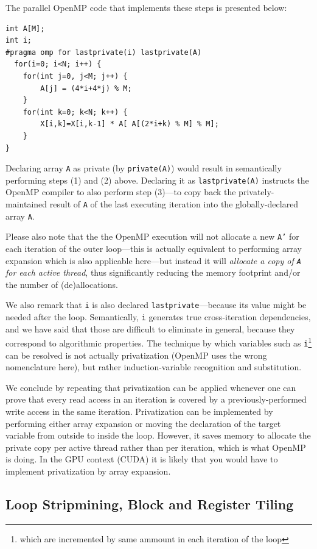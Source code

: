 \documentclass[acmsmall,review]{acmart}\settopmatter{printfolios=true,printccs=false,printacmref=false}
\begin{document}
The parallel OpenMP code that implements these steps is 
presented below:
\begin{lstlisting}[mathescape=true]
int A[M];
int i;
#pragma omp for lastprivate(i) lastprivate(A) 
  for(i=0; i<N; i++) {
    for(int j=0, j<M; j++) {
        A[j] = (4*i+4*j) % M;
    }
    for(int k=0; k<N; k++) {
        X[i,k]=X[i,k-1] * A[ A[(2*i+k) % M] % M];
    }
}
\end{lstlisting}\vspace{-2ex}
Declaring array {\tt A} as private (by {\tt private(A)}) would 
result in semantically performing steps (1) 
and (2) above. Declaring it as {\tt lastprivate(A)} instructs 
the OpenMP compiler to also perform step (3)---to copy back 
the privately-maintained result of {\tt A} of the last executing 
iteration into the globally-declared array {\tt A}.

Please also note that the the OpenMP execution will not allocate
a new {\tt A'} for each iteration of the outer loop---this is 
actually equivalent to performing array expansion which is also
applicable here---but instead it will {\em allocate a copy of 
{\tt A} for each active thread}, thus significantly reducing 
the memory footprint and/or the number of (de)allocations.
 
We also remark that {\tt i} is also declared
{\tt lastprivate}---because its value might be needed after
the loop. Semantically, {\tt i} generates true cross-iteration
dependencies, and we have said that those are difficult to eliminate
in general, because they correspond to algorithmic properties.
The technique by which variables such as {\tt i}\footnote{which are
incremented by same ammount in each iteration of the loop} can 
be resolved is not actually privatization (OpenMP uses the wrong 
nomenclature here), but rather induction-variable recognition and 
substitution.

We conclude by repeating that privatization can be applied whenever
one can prove that every read access in an iteration is covered by 
a previously-performed write access in the same iteration. 
Privatization can be implemented by performing either array 
expansion or moving the declaration of the target variable from
outside to inside the loop. However, it saves memory to allocate
the private copy per active thread rather than per iteration,
which is what OpenMP is doing. In the GPU context (CUDA) it is
likely that you would have to implement privatization by 
array expansion.
 
\subsection{Loop Stripmining, Block and Register Tiling}
\label{subsec:strip-tiling}
\end{document}
